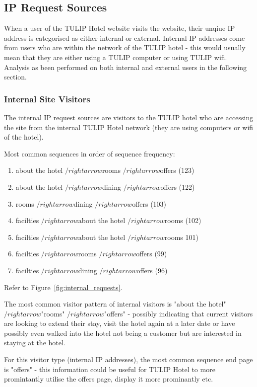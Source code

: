 \subsection{IP Request Sources}
\label{sec:results:ip_source}

\newcommand{\ra}[]{$/rightarrow$}

When a user of the TULIP Hotel website visits the website, their unqiue IP address is categorised as either internal or external. Internal IP addresses come from users who are within the network of the TULIP hotel - this would usually mean that they are either using a TULIP computer or using TULIP wifi. Analysis as been performed on both internal and external users in the following section.

\subsubsection{Internal Site Visitors}

The internal IP request sources are visitors to the TULIP hotel who are accessing the site from the internal TULIP Hotel network (they are using computers or wifi of the hotel).

\label{sec:results:ip_source:internal}

Most common sequences in order of sequence frequency:
\begin{enumerate}
  \item about the hotel \ra rooms \ra offers (123)
  \item about the hotel \ra dining \ra offers (122)
  \item rooms \ra dining \ra offers (103)
  \item facilties \ra about the hotel \ra rooms (102)
  \item facilties \ra about the hotel \ra rooms 101)
  \item facilties \ra rooms \ra offers (99)
  \item facilties \ra dining \ra offers (96)
\end{enumerate}

Refer to Figure~\ref{fig:internal_requests}.

The most common visitor pattern of internal visitors is "about the hotel" \ra "rooms" \ra "offers" - possibly indicating that current visitors are looking to extend their stay, visit the hotel again at a later date or have possibly even walked into the hotel not being a customer but are interested in staying at the hotel.

For this visitor type (internal IP addresses), the most common sequence end page is "offers" - this information could be useful for TULIP Hotel to more promintantly utilise the offers page, display it more prominantly etc.

